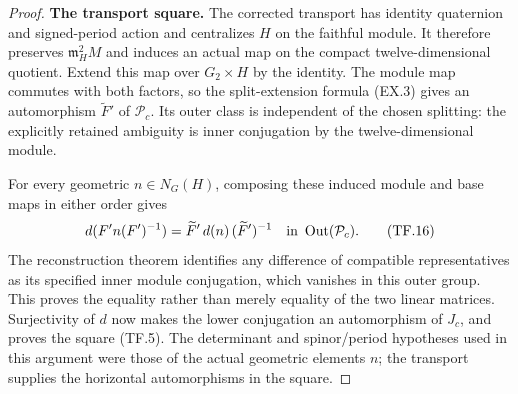 \begin{proof}
\par\medskip\noindent\textbf{The transport square.}\quad
The corrected transport has identity quaternion
and signed-period action and centralizes \(H\) on
the faithful module. It therefore preserves
\(\mathfrak m_H^2M\) and induces an actual map on
the compact twelve-dimensional quotient. Extend this
map over \(G_2\times H\) by the identity.
The module map commutes with both factors, so the
split-extension formula (EX.3) gives an automorphism
\(\widetilde F'\) of \(\mathcal P_c\).
Its outer class is independent of the chosen splitting:
the explicitly retained ambiguity is inner
conjugation by the twelve-dimensional module.

For every geometric \(n\in N_G(H)\), composing
these induced module and base maps in either order
gives
\[
 d(F'n(F')^{-1})=
       \widetilde F'\,d(n)\,(\widetilde F')^{-1}
                         \quad\hbox{in }\operatorname{Out}(\mathcal P_c).
 \tag{TF.16}
\]
The reconstruction theorem identifies any difference
of compatible representatives as its specified inner
module conjugation, which vanishes in this outer group.
This proves the equality rather than merely equality
of the two linear matrices. Surjectivity of \(d\)
now makes the lower conjugation an automorphism of
\(J_c\), and proves the square (TF.5).
The determinant and spinor/period hypotheses used in
this argument were those of the actual geometric
elements \(n\); the transport supplies the horizontal
automorphisms in the square.
\end{proof}
